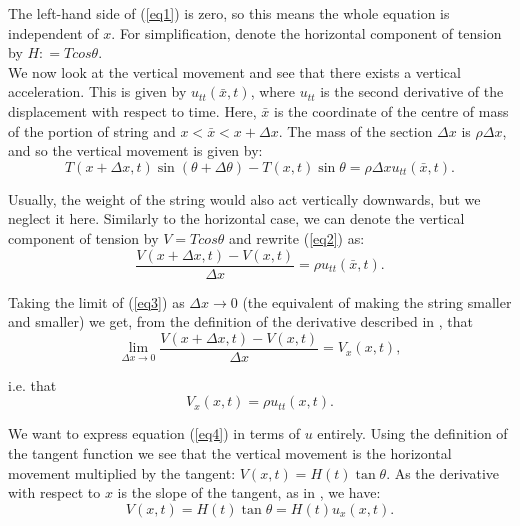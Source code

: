 \documentclass[a4paper, 12pt]{article}
\numberwithin{equation}{section}
\begin{document}
The left-hand side of (\ref{eq1}) is zero, so this means the whole equation is independent of $x$. For simplification, 
denote the horizontal component of tension by $H: = Tcos\theta$. \\

We now look at the vertical movement and see that there exists a vertical acceleration. This is given by $u_{tt} (\bar{x},t)$, 
where $u_{tt}$ is the second derivative of the displacement with respect to time. Here, $\bar{x}$ is 
the coordinate of the centre of mass of the portion of string and $x<\bar{x}<x+\Delta x$. 
The mass of the section $\Delta x$ is $\rho\Delta x$, and so the vertical movement is given by:
 \begin{equation} \label{eq2}
    T(x+\Delta x,t)\sin{(\theta + \Delta \theta)}-T(x,t)\sin{\theta}=\rho\Delta x u_{tt} (\bar{x},t).
 \end{equation}

 Usually, the weight of the string would also act vertically downwards, but we
 neglect it here. Similarly to the horizontal case, we can denote the vertical
 component of tension by $V=Tcos\theta$ and rewrite (\ref{eq2}) as:
 \begin{equation} \label{eq3}
    \frac{V(x+\Delta x,t)-V(x,t)}{\Delta x}=\rho u_{tt} (\bar{x},t).
 \end{equation}

 Taking the limit of (\ref{eq3}) as $\Delta x \rightarrow 0$ (the equivalent of
 making the string smaller and smaller) we get, from the definition of the
 derivative described in \cite[Ch. 9]{Spi}, that 
 \begin{equation*}
    \lim_{\Delta x \rightarrow 0}\frac{V(x+\Delta x,t)-V(x,t)}{\Delta x}=V_x(x,t),
 \end{equation*}

i.e. that 
\begin {equation} \label{eq4}
    V_x(x,t)=\rho u_{tt} (x,t).
\end{equation}

We want to express equation (\ref{eq4}) in terms of $u$ entirely. Using the
definition of the tangent function we see that the vertical movement is the
horizontal movement multiplied by the tangent: $V(x, t)=H(t)\tan{\theta}$. As the
derivative with respect to $x$ is the slope of the tangent, as in \cite[Ch.
9]{Spi}, we have:
\begin{equation} \label{eq5}
    V(x,t)=H(t)\tan{\theta}=H(t)u_x(x,t).
\end{equation}
\end{document}
